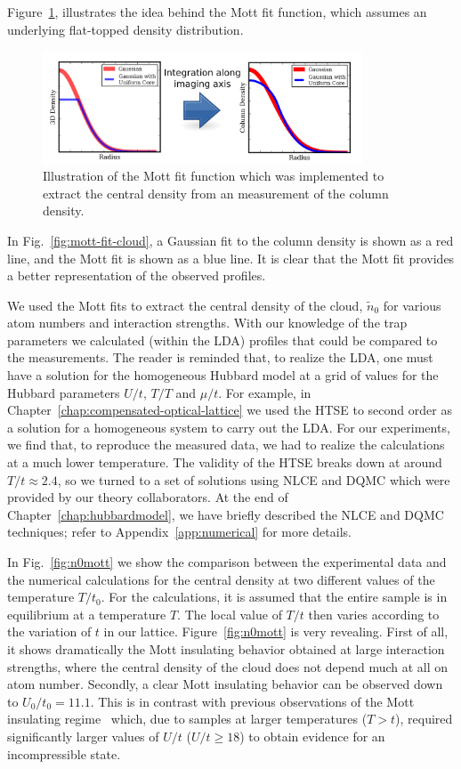 Figure~\ref{fig:mott-fit-ill}, illustrates the idea behind the Mott fit
function, which assumes an underlying flat-topped density distribution. 
\begin{figure}
    \centering
\includegraphics[width=0.85\textwidth]{../figures/mott/mott-fit-illustration.png}
\caption{\small Illustration of the Mott fit function which was implemented to
extract the central density from an  measurement of the column
density.  }  
\label{fig:mott-fit-ill}
\end{figure}
In Fig.~\ref{fig:mott-fit-cloud}, a Gaussian fit to the column density is shown
as a red line, and the Mott fit is shown as a blue line.  It is clear that the
Mott fit provides a better representation of the observed profiles. 

We used the Mott fits to extract the central density of the cloud,
$\tilde{n}_{0}$ for various atom numbers and interaction strengths.  With our
knowledge of the trap parameters we calculated (within the LDA) profiles that
could be compared to the measurements.  The reader is reminded that, to realize
the LDA, one must have a solution for the homogeneous Hubbard model at a grid
of values for the Hubbard parameters $U/t$, $T/T$ and $\mu/t$. For example, in
Chapter~\ref{chap:compensated-optical-lattice} we used the HTSE to second
order as a solution for a homogeneous system to carry out the LDA.  For our
experiments, we find that, to reproduce the measured data, we had to realize
the calculations at a much lower temperature.  The validity of the HTSE breaks
down at around $T/t\approx 2.4$,  so we turned to a set of solutions using NLCE
and DQMC which were provided by our theory collaborators.   At the end of
Chapter~\ref{chap:hubbardmodel}, we have briefly described the NLCE and DQMC
techniques; refer to Appendix~\ref{app:numerical} for more details. 


In Fig.~\ref{fig:n0mott} we show the comparison between the experimental data
and the numerical calculations for the central density  at two different values
of the temperature $T/t_{0}$.  For the calculations, it is assumed that the
entire sample is in equilibrium at a temperature $T$.  The local value of $T/t$
then varies according to the variation of $t$ in our lattice.  \FigureThree
Figure~\ref{fig:n0mott} is very revealing.  First of all, it shows dramatically
the Mott insulating behavior obtained at large interaction strengths, where the
central density of the cloud does not depend much at all on atom number.
Secondly,  a clear Mott insulating behavior can be observed down to
$U_{0}/t_{0}=11.1$.   This is in contrast with previous observations of the
Mott insulating regime~\cite{Jordens2008,Schneider2008} which, due to samples
at larger temperatures ($T>t$), required significantly larger values of $U/t$
($U/t \geq 18$) to obtain evidence for an incompressible state.   

